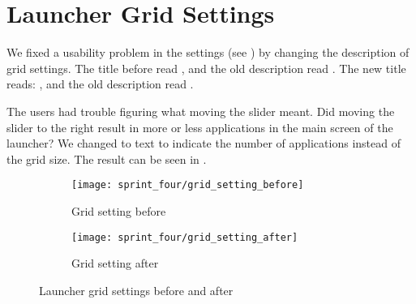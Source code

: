 
\section{Launcher Grid Settings}
\label{sec:launcher_grid_setting}
We fixed a usability problem in the \launcher settings (see ) by changing the description of grid settings. The title before read , and the old description read . The new title reads: , and the old description read .

The users had trouble figuring what moving the slider meant. Did moving the slider to the right result in more or less applications in the main screen of the launcher? We changed to text to indicate the number of applications instead of the grid size. The result can be seen in . 

\begin{figure}[!htbp]
    \centering

    \begin{subfigure}[t]{0.75\textwidth}
        \texttt{[image: sprint\_four/grid\_setting\_before]}
        \caption{Grid setting before}
        \label{fig:launcher_grid_settings_old}
        \vspace*{1cm}
    \end{subfigure}
    \begin{subfigure}[t]{0.75\textwidth}
        \texttt{[image: sprint\_four/grid\_setting\_after]}
        \caption{Grid setting after}
        \label{fig:launcher_grid_settings_new}
    \end{subfigure}
    
    \caption{Launcher grid settings before and after}
    \label{fig:launcher_grid_settings}
\end{figure}